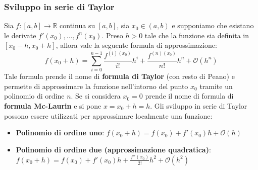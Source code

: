 \documentclass[12pt]{article}
\begin{document}
\subsubsection{Sviluppo in serie di Taylor}
Sia $f:[a,b] \rightarrow \mathbb{R}$ continua su $[a,b]$, sia $x_0 \in (a,b)$ e supponiamo che esistano le derivate $f'(x_0), ..., f^n(x_0)$. Preso
$h>0$ tale che la funzione sia definita in $[x_0-h, x_0+h]$, allora vale la seguente formula di approssimazione:
$$f(x_0 + h) = \sum_{i=0}^{n-1} \frac{f^{(i)(x_0)}}{i!}h^i + \frac{f^{(n)(x_0)}}{n!}h^n + \mathcal{O}(h^n)$$
Tale formula prende il nome di \textbf{formula di Taylor} (con resto di Peano) e permette di approssimare la funzione nell'intorno del punto $x_0$ tramite un polinomio di ordine $n$.
Se si considera $x_0 = 0$ prende il nome di formula di \textbf{formula Mc-Laurin} e si pone $x = x_0 + h = h$.
Gli sviluppo in serie di Taylor possono essere utilizzati per approssimare localmente una funzione:
\begin{itemize}
    \item \textbf{Polinomio di ordine uno}: $f(x_0 + h) = f(x_0) + f'(x_0)h + \mathcal{O}(h)$
    \item \textbf{Polinomio di ordine due (approssimazione quadratica)}: \newline$f(x_0+h) = f(x_0)+f'(x_0)h+\frac{f''(x_0)}{2!}h^2 + \mathcal{O}(h^2)$
\end{itemize}
\end{document}
